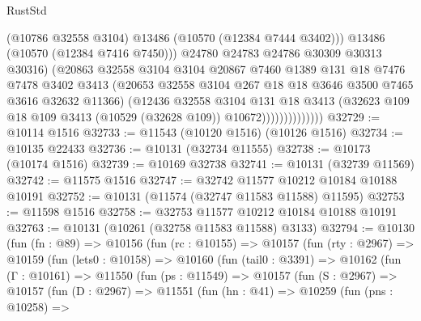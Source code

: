\begin{lexlean}{RustStd}
\begin{coremodule}
                                (@10786 @32558 @3104)
                                @13486
                                (@10570 (@12384 @7444 @3402)))
                              @13486
                              (@10570 (@12384 @7416 @7450)))
                            @24780
                            @24783
                            @24786
                            @30309
                            @30313
                            @30316)
                          (@20863
                            @32558
                            @3104
                            @3104
                            @20867
                            @7460
                            @1389
                            @131
                            @18
                            @7476
                            @7478
                            @3402
                            @3413
                            (@20653 @32558 @3104 @267 @18 @18 @3646 @3500 @7465 @3616 @32632 @11366)
                            (@12436
                              @32558
                              @3104
                              @131
                              @18
                              @3413
                              (@32623
                                @109
                                @18
                                @109
                                @3413
                                (@10529 (@32628 @109))
                                @10672))))))))))))))
@32729 := @10114 @1516
@32733 := @11543 (@10120 @1516) (@10126 @1516)
@32734 := @10135 @22433
@32736 := @10131 (@32734 @11555)
@32738 := @10173 (@10174 @1516)
@32739 := @10169 @32738
@32741 := @10131 (@32739 @11569)
@32742 := @11575 @1516
@32747 := @32742 @11577 @10212 @10184 @10188 @10191
@32752 := @10131 (@11574 (@32747 @11583 @11588) @11595)
@32753 := @11598 @1516
@32758 := @32753 @11577 @10212 @10184 @10188 @10191
@32763 := @10131 (@10261 (@32758 @11583 @11588) @3133)
@32794 := @10130
    (fun (fn : @89) =>
    @10156
      (fun (rc : @10155) =>
      @10157
        (fun (rty : @2967) =>
        @10159
          (fun (lets0 : @10158) =>
          @10160
            (fun (tail0 : @3391) =>
            @10162
              (fun (Γ : @10161) =>
              @11550
                (fun (ps : @11549) =>
                @10157
                  (fun (S : @2967) =>
                  @10157
                    (fun (D : @2967) =>
                    @11551
                      (fun (hn : @41) =>
                      @10259
                        (fun (pns : @10258) =>

\end{coremodule}
\end{lexlean}
